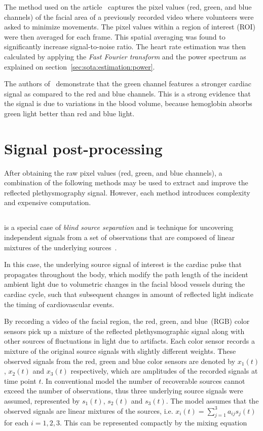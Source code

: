 The method used on the article~\cite{Verkruysse2008Remote} captures the pixel
values (red, green, and blue channels) of the facial area of a previously
recorded video where volunteers were asked to minimize movements. The pixel
values within a region of interest (ROI) were then averaged for each frame.
This spatial averaging was found to significantly increase signal-to-noise
ratio. The heart rate estimation was then calculated by applying the
\emph{Fast Fourier transform} and the power spectrum as explained on
section~\ref{sec:sota:estimation:power}.

The authors of~\cite{Verkruysse2008Remote} demonstrate that
the green channel features a stronger cardiac signal as compared to the
red and blue channels. This is a strong evidence that the signal is due to
variations in the blood volume, because hemoglobin absorbs green light
better than red and blue light.

\section{Signal post-processing} \label{sec:sota:post}

After obtaining the raw pixel values (red, green, and blue channels), a
combination of the following methods may be used to extract and improve the
reflected plethysmography signal. However, each method introduces complexity
and expensive computation.

\subsection{\ica} \label{sec:sota:post:ica}

\ica{} is a special case of \emph{blind source separation} and is
technique for uncovering independent signals from a set of observations
that are composed of linear mixtures of the underlying
sources~\cite{Comon1994Independent}.

In this case, the underlying source signal of interest is the cardiac pulse
that propagates throughout the body, which modify the path length of the
incident ambient light due to volumetric changes in the facial blood vessels
during the cardiac cycle, such that subsequent changes in amount of reflected
light indicate the timing of cardiovascular events.

By recording a video of
the facial region, the red, green, and blue~(RGB) color sensors pick up a
mixture of the reflected plethysmographic signal along with other sources of
fluctuations in light due to artifacts. Each color sensor records a mixture
of the original source signals with slightly different weights. These observed
signals from the red, green and blue color sensors are denoted by $x_{1}(t)$,
$x_{2}(t)$ and $x_{3}(t)$ respectively, which are amplitudes of the recorded
signals at time point $t$. In conventional \ica{} model the number of
recoverable sources cannot exceed the number of observations, thus three
underlying source signals were assumed, represented by $s_{1}(t)$, $s_{2}(t)$
and $s_{3}(t)$. The \ica{} model assumes that the observed signals are linear
mixtures of the sources, i.e. $x_{i}(t) = \sum_{j=1}^{3} a_{ij} s_{j}(t)$ for
each $i=1,2,3$. This can be represented compactly by the mixing equation

